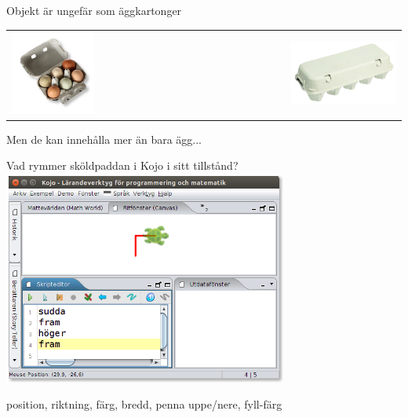 \ifkompendium\else
\begin{SlideExtra}{Objekt är ungefär som äggkartonger}
  \begin{tabular}{l r}
    \includegraphics[width=0.5\textwidth]{../img/egg-box}
    &
    \includegraphics[width=0.5\textwidth]{../img/egg-box-closed}
  \end{tabular}
  Men de kan innehålla mer än bara ägg...
\end{SlideExtra}
\fi

\begin{Slide}{Vad rymmer sköldpaddan i Kojo i sitt tillstånd?}
\centering
\includegraphics[width=0.7\textwidth]{../img/kojo}

\pause position, riktning, färg, bredd, penna uppe/nere, fyll-färg
\end{Slide}




